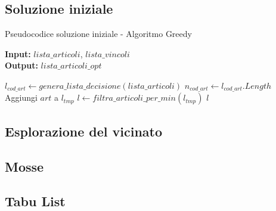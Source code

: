 \subsection{Soluzione iniziale}
\label{sec:soluzione-iniziale}

\begin{algorithm}
    \captionsetup{labelformat=empty}
    \caption{Pseudocodice soluzione iniziale - Algoritmo Greedy}
    \vspace{0.1cm}
    \hspace*{\algorithmicindent} \textbf{Input:} {$lista\_articoli$}, {$lista\_vincoli$}\\
    \hspace*{\algorithmicindent} \textbf{Output:} {$lista\_articoli\_opt$}
    \begin{algorithmic}[1]
        \State $l_{cod\_art} \gets genera\_lista\_decisione(lista\_articoli)$
        \State $n_{cod\_art} \gets l_{cod\_art}.Length$
                    \State Aggiungi $art$ a $l_{tmp}$
                \EndIf
            \EndFor
        \EndWhile
        \State $l \gets filtra\_articoli\_per\_min(l_{tmp})$
        \State \Return $l$
        \EndProcedure
    \end{algorithmic}
\end{algorithm}

\subsection{Esplorazione del vicinato}
\label{sec:esplorazione-vicinato}

\subsection{Mosse}
\label{sec:mosse}

\subsection{Tabu List}
\label{sec:tabu-list}

